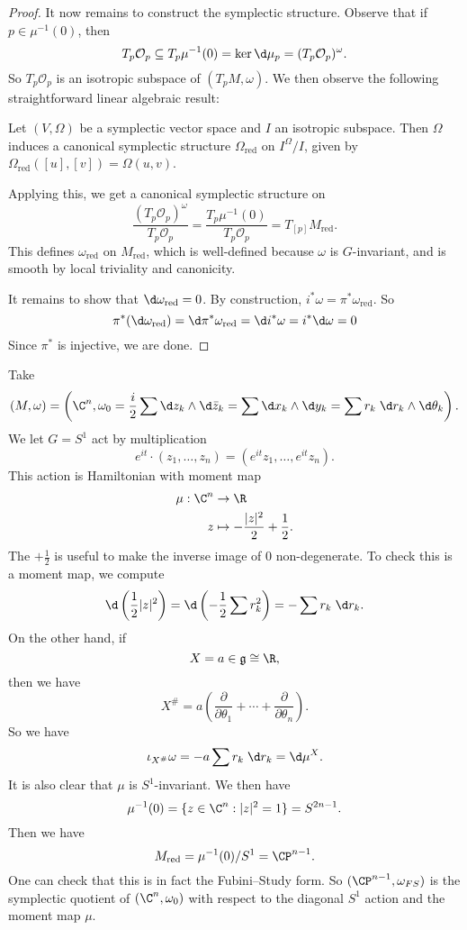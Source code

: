 \documentclass[a4paper]{article}
\newcommand\red{\mathrm{red}}
\begin{document}
\begin{proof}
  It now remains to construct the symplectic structure. Observe that if $p \in \mu^{-1}(0)$, then
  \[
    T_p \mathcal{O}_p \subseteq T_p \mu^{-1}(0) = \ker \d \mu_p = (T_p \mathcal{O}_p)^\omega.
  \]
  So $T_p \mathcal{O}_p$ is an isotropic subspace of $(T_p M, \omega)$. We then observe the following straightforward linear algebraic result:

  \begin{lemma}
    Let $(V, \Omega)$ be a symplectic vector space and $I$ an isotropic subspace. Then $\Omega$ induces a canonical symplectic structure $\Omega_{\red}$ on $I^\Omega/I$, given by $\Omega_{\red}([u], [v]) = \Omega(u, v)$.
  \end{lemma}

  Applying this, we get a canonical symplectic structure on
  \[
    \frac{(T_p\mathcal{O}_p)^\omega}{T_p \mathcal{O}_p} = \frac{T_p \mu^{-1}(0)}{T_p \mathcal{O}_p} = T_{[p]} M_{\red}.
  \]
  This defines $\omega_{\red}$ on $M_{\red}$, which is well-defined because $\omega$ is $G$-invariant, and is smooth by local triviality and canonicity.

  It remains to show that $\d \omega_{\red} = 0$. By construction, $i^* \omega = \pi^* \omega_{\red}$. So
  \[
    \pi^* (\d \omega_{\red}) = \d \pi^* \omega_{\red} = \d i^* \omega = i^* \d \omega = 0
  \]
  Since $\pi^*$ is injective, we are done.
\end{proof}

\begin{eg}
  Take
  \[
    (M, \omega) = \left(\C^n, \omega_0 = \frac{i}{2} \sum \d z_k \wedge \d \bar{z}_k = \sum \d x_k \wedge \d y_k = \sum r_k \;\d r_k \wedge \d \theta_k\right).
  \]
  We let $G = S^1$ act by multiplication
  \[
    e^{it} \cdot (z_1, \ldots, z_n) = (e^{it} z_1, \ldots, e^{it} z_n).
  \]
  This action is Hamiltonian with moment map
  \begin{align*}
    \mu: \C^n &\to \R\\
    z &\mapsto - \frac{|z|^2}{2} + \frac{1}{2}.
  \end{align*}
  The $+\frac{1}{2}$ is useful to make the inverse image of $0$ non-degenerate. To check this is a moment map, we compute
  \[
    \d \left(\frac{1}{2} |z|^2\right) = \d \left(-\frac{1}{2} \sum r_k^2\right) = - \sum r_k \;\d r_k.
  \]
  On the other hand, if
  \[
    X = a \in \mathfrak{g} \cong \R,
  \]
  then we have
  \[
    X^\# = a \left(\frac{\partial}{\partial \theta_1} + \cdots + \frac{\partial}{\partial \theta_n}\right).
  \]
  So we have
  \[
    \iota_{X^\#} \omega = - a \sum r_k \;\d r_k = \d \mu^X.
  \]
  It is also clear that $\mu$ is $S^1$-invariant. We then have
  \[
    \mu^{-1}(0) = \{z \in \C^n : |z|^2 = 1\} = S^{2n - 1}.
  \]
  Then we have
  \[
    M_{\red} = \mu^{-1}(0)/S^1 = \CP^{n - 1}.
  \]
  One can check that this is in fact the Fubini--Study form. So $(\CP^{n - 1}, \omega_{FS})$ is the symplectic quotient of $(\C^n, \omega_0)$ with respect to the diagonal $S^1$ action and the moment map $\mu$.
\end{eg}
\end{document}
